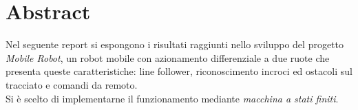 \section*{Abstract}
Nel seguente report si espongono i risultati raggiunti nello sviluppo del progetto \emph{Mobile Robot}, un robot mobile con azionamento differenziale a due ruote che presenta queste caratteristiche:
 line follower, riconoscimento incroci ed ostacoli sul tracciato e comandi da remoto.\\
Si è scelto di implementarne il funzionamento mediante \emph{macchina a stati finiti}.

